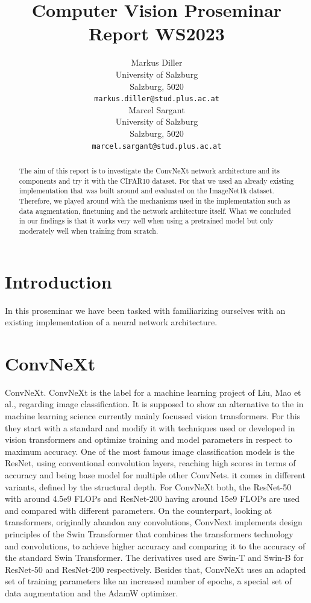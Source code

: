 \documentclass{article}
\title{Computer Vision Proseminar Report WS2023}
\author{%
    Markus Diller\\
    University of Salzburg\\
    Salzburg, 5020 \\
    \texttt{markus.diller@stud.plus.ac.at} \\
    \And
    Marcel Sargant \\
    University of Salzburg \\
    Salzburg, 5020 \\
    \texttt{marcel.sargant@stud.plus.ac.at} \\
}
\begin{document}
\maketitle


\begin{abstract}
    The aim of this report is to investigate the ConvNeXt network architecture and its components and try it with the CIFAR10 dataset.
    For that we used an already existing implementation that was built around and evaluated on the ImageNet1k dataset.
    Therefore, we played around with the mechanisms used in the implementation such as data augmentation, finetuning and the network architecture itself.
    What we concluded in our findings is that it works very well when using a pretrained model but only moderately well when training from scratch.
\end{abstract}


\section{Introduction}\label{sec:introduction}
In this proseminar we have been tasked with familiarizing ourselves with an existing implementation of a neural network architecture.

\section{ConvNeXt}\label{sec:convnext}
ConvNeXt\cite{liu2022convnet}.
ConvNeXt is the label for a machine learning project of Liu, Mao et al., regarding image classification.
It is supposed to show an alternative to the in machine learning science currently mainly focussed vision transformers.
For this they start with a standard and modify it with techniques used or developed in vision transformers and optimize training and model parameters in respect to maximum accuracy.
One of the most famous image classification models is the ResNet, using conventional convolution layers, reaching high scores in terms of accuracy and being base model for multiple other ConvNets.
it comes in different variants, defined by the structural depth.
For ConvNeXt both, the ResNet-50 with around 4.5e9 FLOPs and ResNet-200 having around 15e9 FLOPs are used and compared with different parameters.
On the counterpart, looking at transformers, originally abandon any convolutions, ConvNext implements design principles of the Swin Transformer that combines the transformers technology and convolutions, to achieve higher accuracy and comparing it to the accuracy of the standard Swin Transformer.
The derivatives used are Swin-T and Swin-B for ResNet-50 and ResNet-200 respectively.
Besides that, ConvNeXt uses an adapted set of training parameters like an increased number of epochs, a special set of data augmentation and the AdamW optimizer.
\end{document}
